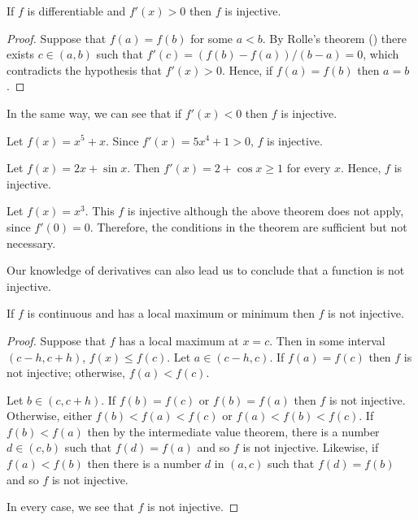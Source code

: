 \begin{theorem} If $f$ is differentiable and
$f'(x) >0 $ then $f$ is
injective.
\label{thm:differentiable criterion}
\begin{proof}
Suppose that $f(a) =f(b) $ for some $a< b$. By
Rolle's theorem () there exists $c\in (a,b) $ such that
$f'(c) =(f(b) -f(a))/(b-a)=0$,
which contradicts the hypothesis that $f'(x) >0 $.
Hence, if $f(a)=f(b)$ then $a=b$.
\end{proof}

In the same way, we can see that if $f'(x)<0$ then $f$ is injective.

\begin{example} Let $f(x) =x^5 + x $. Since $f'(x) = 5x^4 + 1 >0$,
$f$ is injective.
\end{example}

\begin{example} Let $f(x) =2x+\sin x $. Then $f'(x) = 2+\cos x \geq 1$
for every $x$. Hence, $f$ is injective. 
\end{example}

\begin{example} Let $f(x) =x^3 $. This $f$ is injective although the
above theorem does not apply, since $f'(0)=0$. 
Therefore, the conditions in the theorem
are sufficient but not necessary.
\end{example}

Our knowledge of derivatives can also lead us to conclude that a
function is not injective.

\begin{theorem} If $f$ is continuous and has a local maximum or minimum then $f$
is not injective.  
\label{thm:continuity criterion}
\begin{proof} Suppose that $f$ has a local maximum at
$x=c$. Then in some interval $(c-h, c+h)$, $f(x)\le f(c)$.  Let $a\in
(c-h, c)$.  If $f(a) =f(c)$ then $f$ is not injective; otherwise,
$f(a) < f(c)$.

Let $b\in (c,c+h)$. If $f(b) = f(c)$ or $f(b) =f(a) $ then $f$
is not injective. Otherwise, either $f(b) < f(a)<f(c) $ or $f(a)
<f(b)<f(c) $. If $f(b) < f(a) $ then by the intermediate value
theorem, there is a number $d\in (c, b) $ such that $f(d) =f(a)$ and
so $f$ is not injective.
 Likewise, if $f(a) < f(b) $ then there is a number $d$ in $(a,c) $
 such that $f(d) = f(b)$ and so $f$ is not injective. 

In every case, we see that $f$ is not injective.
\end{proof}


\end{theorem}
\end{theorem}
